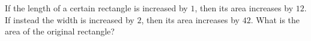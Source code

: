If the length of a certain rectangle is increased by $1$, then its area increases by $12$. If instead the width is increased by $2$, then its area increases by $42$. What is the area of the original rectangle?
